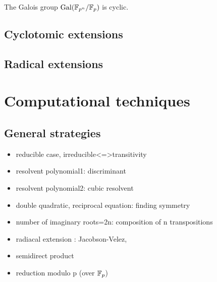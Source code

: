 \documentclass{../exp}
\begin{document}
\begin{thm}
The Galois group $\operatorname{Gal}(\mathbb{F}_{p^n}/\mathbb{F}_p)$ is cyclic.
\end{thm}

\subsection{Cyclotomic extensions}


\subsection{Radical extensions}









\section{Computational techniques}

\subsection{General strategies}
\begin{itemize}
\item reducible case, irreducible<=>transitivity
\item resolvent polynomial1: discriminant
\item resolvent polynomial2: cubic resolvent
\item double quadratic, reciprocal equation: finding symmetry
\item number of imaginary roots=2n: composition of n transpositions
\item radiacal extension : Jacobson-Velez,
\item semidirect product
\item reduction modulo p (over $\mathbb{F}_p$)
\end{itemize}
\end{document}
